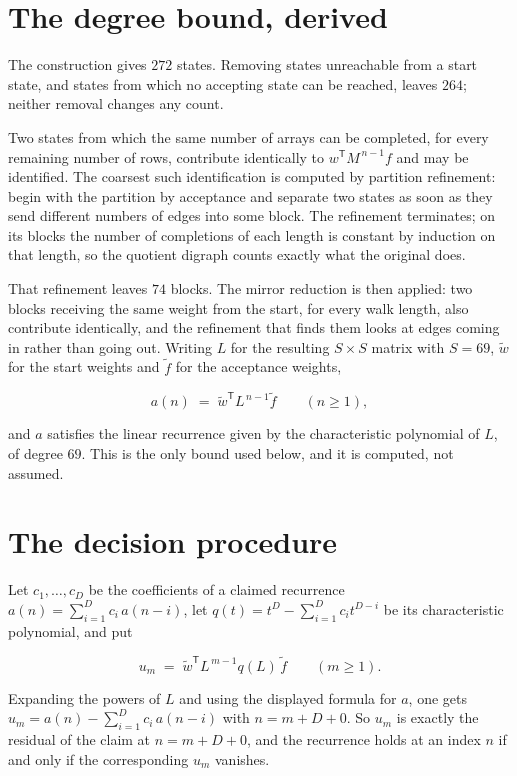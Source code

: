 \documentclass[11pt]{article}
\theoremstyle{definition}
\begin{document}
\section{The degree bound, derived}

The construction gives $272$ states. Removing states unreachable from a start state, and states from which no accepting state can be reached, leaves $264$; neither removal changes any count.

Two states from which the same number of arrays can be completed, for every remaining number of rows, contribute identically to $w^{\mathsf T}M^{\,n-1}f$ and may be identified. The coarsest such identification is computed by partition refinement: begin with the partition by acceptance and separate two states as soon as they send different numbers of edges into some block. The refinement terminates; on its blocks the number of completions of each length is constant by induction on that length, so the quotient digraph counts exactly what the original does.

That refinement leaves $74$ blocks. The mirror reduction is then applied: two blocks receiving the same weight from the start, for every walk length, also contribute identically, and the refinement that finds them looks at edges coming in rather than going out. Writing $L$ for the resulting $S \times S$ matrix with $S = 69$, $\tilde w$ for the start weights and $\tilde f$ for the acceptance weights,

\[a(n) \;=\; \tilde w^{\mathsf T} L^{\,n-1} \tilde f \qquad (n \ge 1),\]

and $a$ satisfies the linear recurrence given by the characteristic polynomial of $L$, of degree $69$. This is the only bound used below, and it is computed, not assumed.

\section{The decision procedure}

Let $c_1,\dots,c_D$ be the coefficients of a claimed recurrence $a(n) = \sum_{i=1}^{D} c_i\,a(n-i)$, let $q(t) = t^{D} - \sum_{i=1}^{D} c_i t^{D-i}$ be its characteristic polynomial, and put

\[u_m \;=\; \tilde w^{\mathsf T} L^{\,m-1} q(L)\,\tilde f \qquad (m \ge 1).\]

Expanding the powers of $L$ and using the displayed formula for $a$, one gets $u_m = a(n) - \sum_{i=1}^{D} c_i\,a(n-i)$ with $n = m + D + 0$. So $u_m$ is exactly the residual of the claim at $n = m + D + 0$, and the recurrence holds at an index $n$ if and only if the corresponding $u_m$ vanishes.
\end{document}
